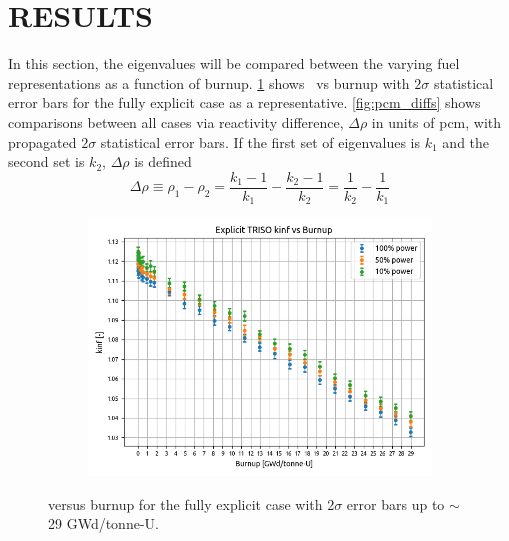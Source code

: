 \documentclass[letterpaper]{physor2024}
\begin{document}
\section{RESULTS}\label{sec:results}
In this section, the eigenvalues will be compared between the varying fuel representations as a function of burnup. \cref{fig:kinf_full_explicit_results} shows \kinf~vs burnup with $2\sigma$ statistical error bars for the fully explicit case as a representative. \cref{fig:pcm_diffs} shows comparisons between all cases via reactivity difference, $\Delta \rho$ in units of \gls{pcm}, with propagated $2\sigma$ statistical error bars. If the first set of eigenvalues is $k_ 1$ and the second set is  $k_2$, $\Delta \rho$ is defined
\begin{equation}
    \Delta \rho \equiv
    \rho_1 - \rho_2 =
    \frac{k_1-1}{k_1} - \frac{k_2 - 1 }{k_2} =
    \frac{1}{k_2} - \frac{1}{k_1}
\end{equation}
\vspace{-0.4cm}
\begin{figure}[!h]
    \centering
    \begin{subfigure}{0.6\linewidth}
        \centering
        \includegraphics[width=\linewidth]{figures/expl_kinf_vs_bu.png}
    \end{subfigure}
    \caption{\kinf versus burnup for the fully explicit case with $2\sigma$ error bars up to $\sim$29 GWd/tonne-U.}
    \label{fig:kinf_full_explicit_results}
\end{figure}
\end{document}
